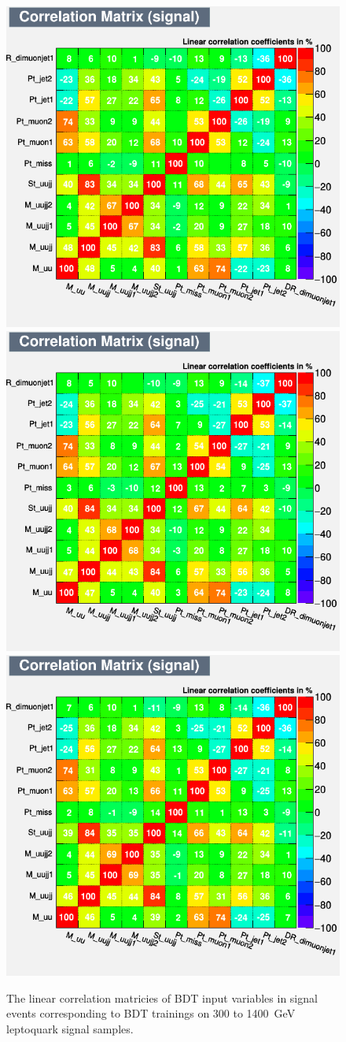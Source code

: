 \begin{figure}[H]
    {\includegraphics[width=.30\textwidth]{Images/Analysis/Results_LQToBMu_pair_uubj_BDTG_FullRun2_2023_01_25_020318/1200/CorrelationMatrixS.png}}
    {\includegraphics[width=.30\textwidth]{Images/Analysis/Results_LQToBMu_pair_uubj_BDTG_FullRun2_2023_01_25_020318/1300/CorrelationMatrixS.png}}
    {\includegraphics[width=.30\textwidth]{Images/Analysis/Results_LQToBMu_pair_uubj_BDTG_FullRun2_2023_01_25_020318/1400/CorrelationMatrixS.png}}
    \caption{The linear correlation matricies of BDT input variables in signal events corresponding to BDT trainings on 300 to \SI{1400}{GeV} leptoquark signal samples.}
    \label{figapp:correlationsSig1}
\end{figure}

